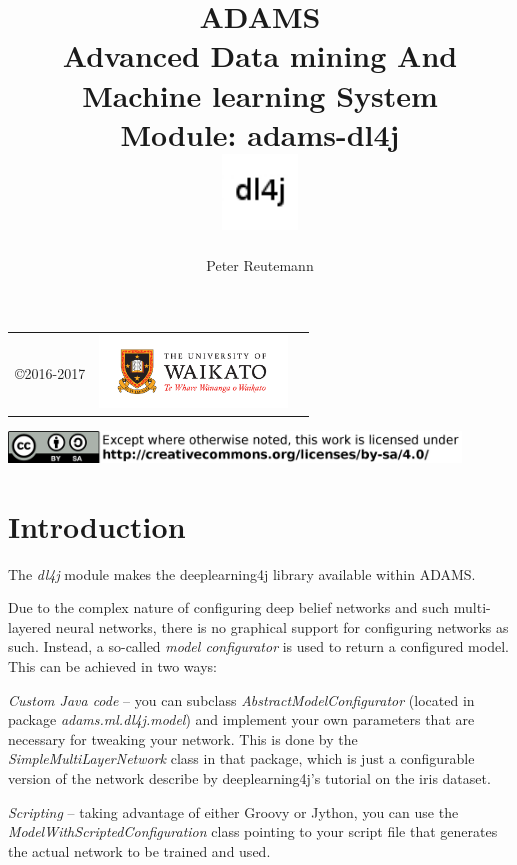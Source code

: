 \documentclass[a4paper]{book}
\title{
  \textbf{ADAMS} \\
  {\Large \textbf{A}dvanced \textbf{D}ata mining \textbf{A}nd \textbf{M}achine
  learning \textbf{S}ystem} \\
  {\Large Module: adams-dl4j} \\
  \vspace{1cm}
  \includegraphics[width=2cm]{images/dl4j-module.png} \\
}
\author{
  Peter Reutemann
}
\begin{document}
\begin{titlepage}
\maketitle

\thispagestyle{empty}
\center
\begin{table}[b]
	\begin{tabular}{c l l}
		\parbox[c][2cm]{2cm}{\copyright 2016-2017} &
		\parbox[c][2cm]{5cm}{\includegraphics[width=5cm]{images/coat_of_arms.pdf}} \\
	\end{tabular}
	\includegraphics[width=12cm]{images/cc.png} \\
\end{table}

\end{titlepage}

\tableofcontents

\chapter{Introduction}
The \textit{dl4j} module makes the deeplearning4j\cite{dl4j} library available
within ADAMS.

Due to the complex nature of configuring deep belief networks and such
multi-layered neural networks, there is no graphical support for configuring
networks as such. Instead, a so-called \textit{model configurator} is used
to return a configured model. This can be achieved in two ways:
\begin{tight_itemize}
  \item \textit{Custom Java code} -- you can subclass
  \textit{AbstractModelConfigurator} (located in package \textit{adams.ml.dl4j.model})
  and implement your own parameters that are necessary for tweaking your network. This is
  done by the \textit{SimpleMultiLayerNetwork} class in that package, which
  is just a configurable version of the network describe by deeplearning4j's
  tutorial on the iris dataset.
  \item \textit{Scripting} -- taking advantage of either Groovy or Jython,
  you can use the \textit{ModelWithScriptedConfiguration} class pointing
  to your script file that generates the actual network to be trained and used.
\end{tight_itemize}
\end{document}
